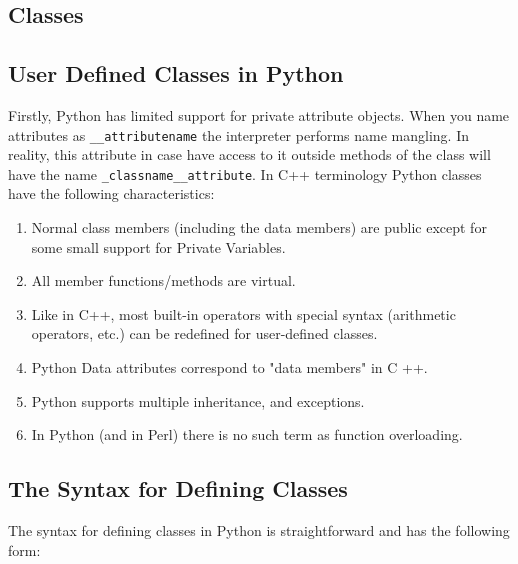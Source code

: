 \documentclass[
]{article}
\begin{document}
\hypertarget{classes}{%
\subsection{Classes}\label{classes}}

\hypertarget{user-defined-classes-in-python}{%
\subsection{User Defined Classes in
Python}\label{user-defined-classes-in-python}}

Firstly, Python has limited support for private attribute objects. When
you name attributes as \texttt{\_\_attributename} the interpreter
performs name mangling. In reality, this attribute in case have access
to it outside methods of the class will have the name
\texttt{\_classname\_\_attribute}. In C++ terminology Python classes
have the following characteristics:

\begin{enumerate}
\def\labelenumi{\arabic{enumi}.}
\item
  Normal class members (including the data members) are public except
  for some small support for Private Variables.
\item
  All member functions/methods are virtual.
\item
  Like in C++, most built-in operators with special syntax (arithmetic
  operators, etc.) can be redefined for user-defined classes.
\item
  Python Data attributes correspond to "data members" in C ++.
\item
  Python supports multiple inheritance, and exceptions.
\item
  In Python (and in Perl) there is no such term as function overloading.
\end{enumerate}

\hypertarget{the-syntax-for-defining-classes}{%
\subsection{The Syntax for Defining
Classes}\label{the-syntax-for-defining-classes}}

The syntax for defining classes in Python is straightforward and has the
following form:
\end{document}
